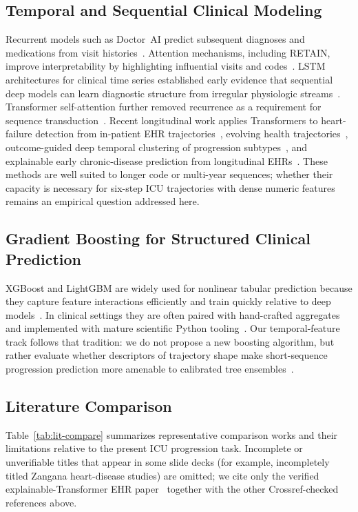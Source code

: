 \documentclass[conference]{IEEEtran}
\begin{document}
\subsection{Temporal and Sequential Clinical Modeling}
Recurrent models such as Doctor~AI predict subsequent diagnoses and medications from visit histories~\cite{choi2016doctorai}. Attention mechanisms, including RETAIN, improve interpretability by highlighting influential visits and codes~\cite{choi2016retain}. LSTM architectures for clinical time series established early evidence that sequential deep models can learn diagnostic structure from irregular physiologic streams~\cite{lipton2016lstm}. Transformer self-attention further removed recurrence as a requirement for sequence transduction~\cite{vaswani2017attention}. Recent longitudinal work applies Transformers to heart-failure detection from in-patient EHR trajectories~\cite{drozdov2024transformer}, evolving health trajectories~\cite{moen2025evolve}, outcome-guided deep temporal clustering of progression subtypes~\cite{wang2024ogdtc}, and explainable early chronic-disease prediction from longitudinal EHRs~\cite{zangana2026explainable}. These methods are well suited to longer code or multi-year sequences; whether their capacity is necessary for six-step ICU trajectories with dense numeric features remains an empirical question addressed here.

\subsection{Gradient Boosting for Structured Clinical Prediction}
XGBoost and LightGBM are widely used for nonlinear tabular prediction because they capture feature interactions efficiently and train quickly relative to deep models~\cite{chen2016xgboost,ke2017lightgbm}. In clinical settings they are often paired with hand-crafted aggregates and implemented with mature scientific Python tooling~\cite{pedregosa2011sklearn}. Our temporal-feature track follows that tradition: we do not propose a new boosting algorithm, but rather evaluate whether descriptors of trajectory shape make short-sequence progression prediction more amenable to calibrated tree ensembles~\cite{niculescu2005calibration}.

\subsection{Literature Comparison}
Table~\ref{tab:lit-compare} summarizes representative comparison works and their limitations relative to the present ICU progression task. Incomplete or unverifiable titles that appear in some slide decks (for example, incompletely titled Zangana heart-disease studies) are omitted; we cite only the verified explainable-Transformer EHR paper~\cite{zangana2026explainable} together with the other Crossref-checked references above.
\end{document}
